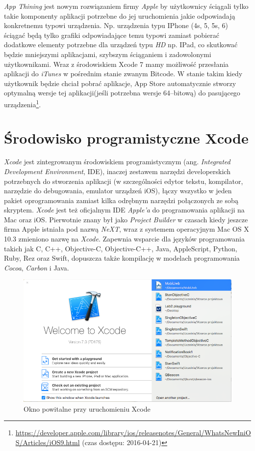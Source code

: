\documentclass{iiuwb}
\begin{document}
\textit{App Thining} jest nowym rozwiązaniem firmy \textit{Apple} by użytkownicy ściągali tylko takie komponenty aplikacji potrzebne do jej uruchomienia jakie odpowiadają konkretnemu typowi urządzenia. Np. urządzenia typu IPhone (4s, 5, 5s, 6) ściągać będą tylko grafiki odpowiadające temu typowi zamiast pobierać dodatkowe elementy potrzebne dla urządzeń typu \textit{HD} np. IPad, co skutkować będzie mniejszymi aplikacjami, szybszym ściąganiem i zadowolonymi użytkownikami. Wraz z środowiskiem Xcode 7 mamy możliwość przesłania aplikacji do \textit{iTunes} w pośrednim stanie zwanym Bitcode. W stanie takim kiedy użytkownik będzie chciał pobrać aplikacje, App Store automatycznie stworzy optymalną wersje tej aplikacji(jeśli potrzebna wersje 64--bitową) do pasującego urządzenia\footnote{\url{https://developer.apple.com/library/ios/releasenotes/General/WhatsNewIniOS/Articles/iOS9.html} (czas dostępu:  2016-04-21)}. 


\section{Środowisko programistyczne Xcode}
\textit{Xcode} jest zintegrowanym środowiskiem programistycznym (ang. \textit{Integrated Development Environment}, IDE), inaczej zestawem narzędzi developerskich potrzebnych do stworzenia aplikacji (w szczególności edytor tekstu, kompilator, narzędzie do debugowania, emulator urządzeń iOS), łączy wszystko w jeden pakiet oprogramowania zamiast kilka odrębnym narzędzi połączonych ze sobą skryptem. \textit{Xcode} jest też oficjalnym IDE \textit{Apple'a} do programowania aplikacji na Mac oraz iOS. Pierwotnie znany był jako \textit{Project Builder} w czasach kiedy jeszcze firma Apple istniała pod nazwą \textit{NeXT}, wraz z systemem operacyjnym Mac OS X 10.3 zmieniono nazwę na \textit{Xcode}. Zapewnia wsparcie dla języków programowania takich jak C, C++, Objective-C, Objective-C++, Java, AppleScript, Python, Ruby, Rez oraz Swift, dopuszcza także kompilację w modelach programowania \textit{Cocoa}, \textit{Carbon} i Java.
\begin{figure}[!th]
\centering
\includegraphics[scale=.5]{image/XcodeOknoPowitalne.png}
\caption{Okno powitalne przy uruchomieniu Xcode}
\label{fig:XcodeOknoPowitalne}
\end{figure}
\end{document}
